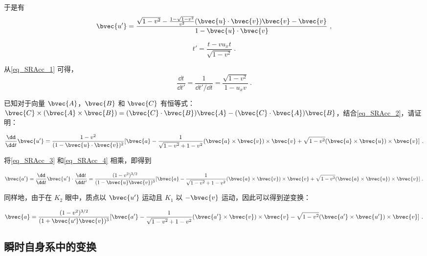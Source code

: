 于是有
\begin{equation}\label{eq_SRAcc_2}
\bvec{u'}=\frac{\sqrt{1-v^2}-\frac{1-\sqrt{1-v^2}}{v^2}(\bvec{u}\cdot\bvec{v})\bvec{v}-\bvec{v}}{1-\bvec{u}\cdot\bvec{v}}~,
\end{equation}

\begin{equation}\label{eq_SRAcc_1}
t'=\frac{t-vu_xt}{\sqrt{1-v^2}}~.
\end{equation}

从\autoref{eq_SRAcc_1} 可得，
\begin{equation}\label{eq_SRAcc_3}
\frac{\dd t}{\dd t'}=\frac{1}{\dd t'/\dd t}=\frac{\sqrt{1-v^2}}{1-u_xv}~.
\end{equation}

\begin{exercise}{}

已知对于向量 $\bvec{A}$，$\bvec{B}$ 和 $\bvec{C}$ 有恒等式：$\bvec{C}\times(\bvec{A}\times\bvec{B})=(\bvec{C}\cdot\bvec{B})\bvec{A}-(\bvec{C}\cdot\bvec{A})\bvec{B}$，结合\autoref{eq_SRAcc_2}，请证明：

\begin{equation}\label{eq_SRAcc_4}
\frac{\dd}{\dd t}\bvec{u'}=\frac{1-v^2}{(1-\bvec{u}\cdot\bvec{v})^2}[\bvec{a}-\frac{1}{\sqrt{1-v^2}+1-v^2}(\bvec{a}\times\bvec{v})\times\bvec{v}+\sqrt{1-v^2}(\bvec{a}\times\bvec{u})\times\bvec{v}]~.
\end{equation}

\end{exercise}

将\autoref{eq_SRAcc_3} 和\autoref{eq_SRAcc_4} 相乘，即得到

\begin{equation}
\bvec{a'}=\frac{\dd}{\dd t}\bvec{u'}\cdot\frac{\dd t}{\dd t'}=\frac{(1-v^2)^{3/2}}{(1-\bvec{u}\bvec{v})^3}[\bvec{a}-\frac{1}{\sqrt{1-v^2}+1-v^2}(\bvec{a}\times\bvec{v})\times\bvec{v}+\sqrt{1-v^2}(\bvec{a}\times\bvec{u})\times\bvec{v}]~.
\end{equation}

同样地，由于在 $K_2$ 眼中，质点以 $\bvec{u'}$ 运动且 $K_1$ 以 $-\bvec{v}$ 运动，因此可以得到逆变换：

\begin{equation}\label{eq_SRAcc_5}
\bvec{a}=\frac{(1-v^2)^{3/2}}{(1+\bvec{u'}\bvec{v})^3}[\bvec{a'}-\frac{1}{\sqrt{1-v^2}+1-v^2}(\bvec{a'}\times\bvec{v})\times\bvec{v}-\sqrt{1-v^2}(\bvec{a'}\times\bvec{u'})\times\bvec{v}]~.
\end{equation}


\subsection{瞬时自身系中的变换}

